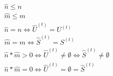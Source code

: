 \begin{Theorem}

\begin{align}
&\widehat{n} \leq n \tag{i.u} \\ 
&\widehat{m} \leq m \tag{i.s} \\
&\widehat{n} = n \Leftrightarrow \widehat{U}^{(t)} = U^{(t)} \tag{ii.u} \\
&\widehat{m} = m \Leftrightarrow \widehat{S}^{(t)} = S^{(t)} \tag{ii.s} \\
&\widehat{n} * \widehat{m} > 0 \Leftrightarrow \widehat{U}^{(t)} \neq \emptyset \Leftrightarrow \widehat{S}^{(t)} \neq \emptyset \tag{iii} \\
&\widehat{n} * \widehat{m} = 0 \Leftrightarrow \widehat{U}^{(t)} = \emptyset = \widehat{S}^{(t)} \tag{iv}
\end{align}

\end{Theorem}

\vspace{0.3cm}

